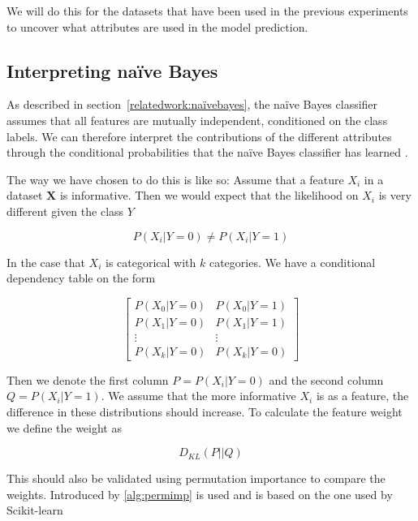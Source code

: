 We will do this for the datasets that have been used in the previous experiments to uncover what attributes are used in the model prediction.

\subsection{Interpreting naïve Bayes}

As described in section~\ref{relatedwork:naïvebayes}, the naïve Bayes classifier assumes that all features are mutually independent, conditioned on the class labels. We can therefore interpret the contributions of the different attributes through the conditional probabilities that the naïve Bayes classifier has learned \cite[p.~142]{Molnar:2020:Book}.

The way we have chosen to do this is like so: Assume that a feature $X_i$ in a dataset $\boldsymbol{X}$ is informative. Then we would expect that the likelihood on $X_i$ is very different given the class $Y$

\begin{equation*}
    P(X_i | Y = 0) \neq P(X_i | Y = 1)
\end{equation*}

In the case that $X_i$ is categorical with $k$ categories. We have a conditional dependency table on the form

\begin{equation*}
    \begin{bmatrix}
        P(X_0 | Y = 0) & P(X_0 | Y = 1) \\ 
        P(X_1 | Y = 0) & P(X_1 | Y = 1) \\
        \vdots & \vdots \\
        P(X_k | Y = 0) & P(X_k | Y = 0)
    \end{bmatrix}
\end{equation*}

Then we denote the first column $P = P(X_i | Y = 0)$ and the second column $Q = P(X_i | Y = 1)$. We assume that the more informative $X_i$ is as a feature, the difference in these distributions should increase. To calculate the feature weight we define the weight as 

\begin{equation*}
    D_{KL}(P||Q)
\end{equation*}

This should also be validated using permutation importance to compare the weights. Introduced by \ref{alg:permimp} is used and is based on the one used by Scikit-learn \cite{Pedregosa:2011:JMLR}

